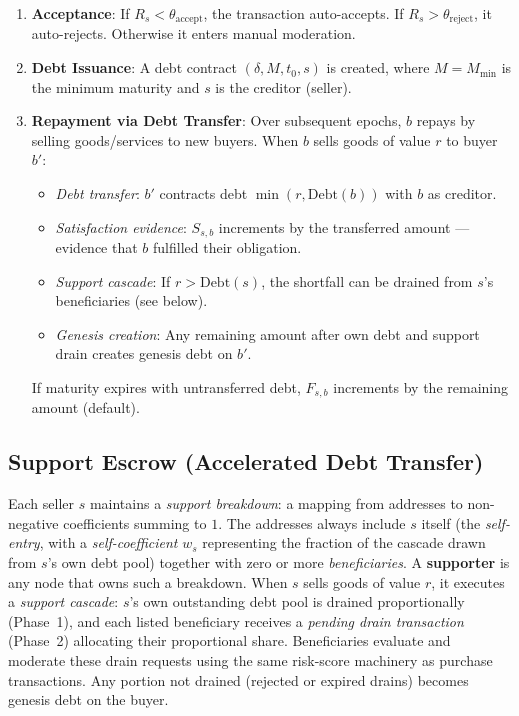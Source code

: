 \documentclass[11pt]{article}
\begin{document}
\begin{enumerate}
\begin{description}
    \end{description}
    \item \textbf{Acceptance}: If $R_s < \theta_{\text{accept}}$, the transaction auto-accepts. If $R_s > \theta_{\text{reject}}$, it auto-rejects. Otherwise it enters manual moderation.
    \item \textbf{Debt Issuance}: A debt contract $(\delta, M, t_0, s)$ is created, where $M = M_{\min}$ is the minimum maturity and $s$ is the creditor (seller).
    \item \textbf{Repayment via Debt Transfer}: Over subsequent epochs, $b$ repays by selling goods/services to new buyers. When $b$ sells goods of value $r$ to buyer $b'$:
    \begin{itemize}
        \item \emph{Debt transfer}: $b'$ contracts debt $\min(r, \text{Debt}(b))$ with $b$ as creditor.
        \item \emph{Satisfaction evidence}: $S_{s,b}$ increments by the transferred amount --- evidence that $b$ fulfilled their obligation.
        \item \emph{Support cascade}: If $r > \text{Debt}(s)$, the shortfall can be drained from $s$'s beneficiaries (see below).
        \item \emph{Genesis creation}: Any remaining amount after own debt and support drain creates genesis debt on $b'$.
    \end{itemize}
    If maturity expires with untransferred debt, $F_{s,b}$ increments by the remaining amount (default).
\end{enumerate}

\subsection{Support Escrow (Accelerated Debt Transfer)}

Each seller $s$ maintains a \emph{support breakdown}: a mapping from addresses to non-negative coefficients summing to $1$. The addresses always include $s$ itself (the \emph{self-entry}, with a \emph{self-coefficient} $w_s$ representing the fraction of the cascade drawn from $s$'s own debt pool) together with zero or more \emph{beneficiaries}. A \textbf{supporter} is any node that owns such a breakdown. When $s$ sells goods of value $r$, it executes a \emph{support cascade}: $s$'s own outstanding debt pool is drained proportionally (Phase~1), and each listed beneficiary receives a \emph{pending drain transaction} (Phase~2) allocating their proportional share. Beneficiaries evaluate and moderate these drain requests using the same risk-score machinery as purchase transactions. Any portion not drained (rejected or expired drains) becomes genesis debt on the buyer.
\end{document}
